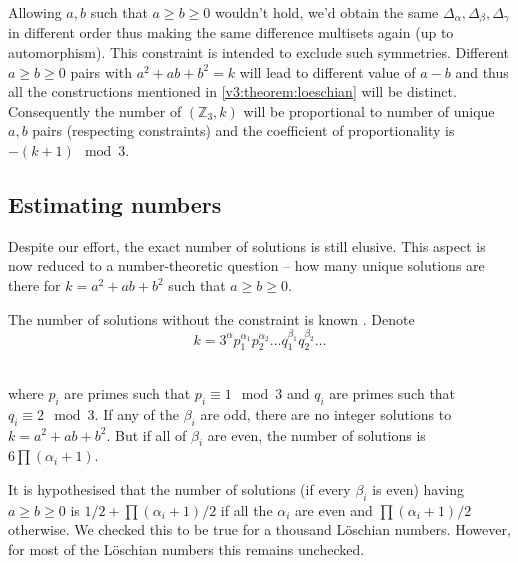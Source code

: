     \begin{remark}
        Allowing $a,b$ such that $a \geq b \geq 0$ wouldn't hold, we'd obtain the same $\Delta_\alpha, \Delta_\beta, \Delta_\gamma$ in different order thus making the same difference multisets again (up to automorphism). This constraint is intended to exclude such symmetries.
        Different $a \geq b \geq 0$ pairs with $a^2+ab+b^2=k$ will lead to different value of $a-b$ and thus all the constructions mentioned in \ref{v3:theorem:loeschian} will be distinct. Consequently the number of $(\mathbb Z_3,k)$ will be proportional to number of unique $a,b$ pairs (respecting constraints) and the coefficient of proportionality is $-(k+1) \mod 3$.
    \end{remark}

    \subsection{Estimating numbers}
        Despite our effort, the exact number of solutions is still elusive. This aspect is now reduced to a number-theoretic question -- how many unique solutions are there for $k=a^2+ab+b^2$ such that $a\geq b\geq 0$.

        The number of solutions without the constraint is known \cite{marmon2005hexagonal}. Denote
        \begin{equation}
            k=3^\alpha p_1^{\alpha_1}p_2^{\alpha_2}\ldots q_1^{\beta_1}q_2^{\beta_2}\ldots
        \end{equation}\
        
        where $p_i$ are primes such that $p_i \equiv 1 \mod 3$ and $q_i$ are primes such that $q_i \equiv 2 \mod 3$. If any of the $\beta_i$ are odd, there are no integer solutions to $k=a^2+ab+b^2$. But if all of $\beta_i$ are even, the number of solutions is $6\prod (\alpha_i +1)$.
        
        It is hypothesised \cite{nair2004elementary} that the number of solutions (if every $\beta_i$ is even) having $a \geq b \geq 0$ is $1/2 + \prod (\alpha_i +1)/2$ if all the $\alpha_i$ are even and $\prod (\alpha_i +1)/2$ otherwise. We checked this to be true for a thousand Löschian numbers. However, for most of the Löschian numbers this remains unchecked.
